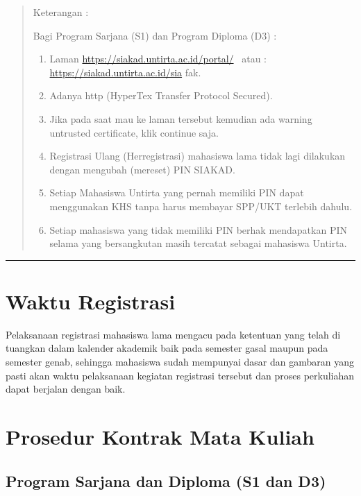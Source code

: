\documentclass[
]{book}
\providecommand{\tightlist}{%
  \setlength{\itemsep}{0pt}\setlength{\parskip}{0pt}}
\begin{document}
\begin{quote}
Keterangan :

Bagi Program Sarjana (S1) dan Program Diploma (D3) :

\begin{enumerate}
\def\labelenumi{\arabic{enumi}.}
\tightlist
\item
  Laman \url{https://siakad.untirta.ac.id/portal/}~ atau : \url{https://siakad.untirta.ac.id/sia} fak.
\item
  Adanya http (HyperTex Transfer Protocol Secured).
\item
  Jika pada saat mau ke laman tersebut kemudian ada warning untrusted certificate, klik continue saja.
\item
  Registrasi Ulang (Herregistrasi) mahasiswa lama tidak lagi dilakukan dengan mengubah (mereset) PIN SIAKAD.
\item
  Setiap Mahasiswa Untirta yang pernah memiliki PIN dapat menggunakan KHS tanpa harus membayar SPP/UKT terlebih dahulu.
\item
  Setiap mahasiswa yang tidak memiliki PIN berhak mendapatkan PIN selama yang bersangkutan masih tercatat sebagai mahasiswa Untirta.
\end{enumerate}
\end{quote}

\begin{center}\rule{0.5\linewidth}{0.5pt}\end{center}

\hypertarget{waktu-registrasi}{%
\section{Waktu Registrasi}\label{waktu-registrasi}}

Pelaksanaan registrasi mahasiswa lama mengacu pada ketentuan yang telah di tuangkan dalam kalender akademik baik pada semester gasal maupun pada semester genab, sehingga mahasiswa sudah mempunyai dasar dan gambaran yang pasti akan waktu pelaksanaan kegiatan registrasi tersebut dan proses perkuliahan dapat berjalan dengan baik.

\hypertarget{prosedur-kontrak-mata-kuliah}{%
\section{Prosedur Kontrak Mata Kuliah}\label{prosedur-kontrak-mata-kuliah}}

\hypertarget{program-sarjana-dan-diploma-s1-dan-d3}{%
\subsection{Program Sarjana dan Diploma (S1 dan D3)}\label{program-sarjana-dan-diploma-s1-dan-d3}}
\end{document}
